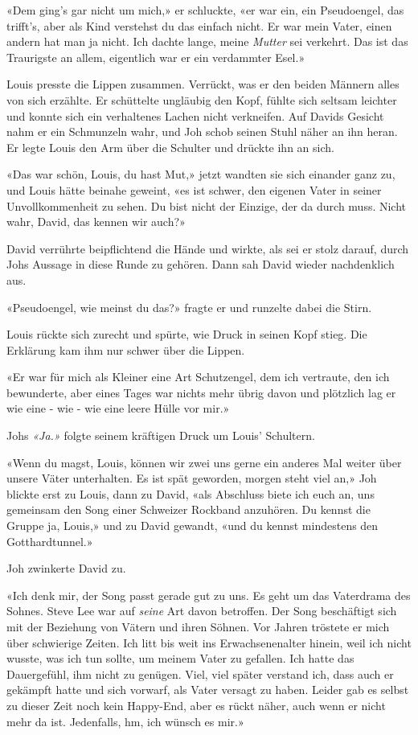 «Dem ging’s gar nicht um mich,» er schluckte, «er
war ein, ein Pseudoengel, das trifft’s, aber als Kind verstehst du das
einfach nicht. Er war mein Vater, einen andern hat man ja nicht. Ich
dachte lange, meine \emph{Mutter} sei verkehrt. Das ist das Traurigste
an allem, eigentlich war er ein verdammter Esel.»

Louis presste die Lippen zusammen. 
Verrückt, was er den beiden Männern alles von sich erzählte. Er schüttelte ungläubig den Kopf, fühlte sich seltsam leichter und konnte 
sich ein verhaltenes Lachen nicht verkneifen. Auf Davids Gesicht nahm er ein Schmunzeln wahr,   
und Joh schob seinen Stuhl näher an ihn heran. 
Er legte Louis den Arm über die Schulter und drückte ihn an sich.

«Das war schön, Louis, du hast Mut,» jetzt wandten sie sich einander
ganz zu, und Louis hätte beinahe geweint, «es ist schwer, den eigenen
Vater in seiner Unvollkommenheit zu sehen. Du bist nicht der Einzige,
der da durch muss. Nicht wahr, David, das kennen wir auch?»

David verrührte beipflichtend die Hände und wirkte, als sei er stolz
darauf, durch Johs Aussage in diese Runde zu gehören. Dann sah David
wieder nachdenklich aus.

«Pseudoengel, wie meinst du das?» fragte er und runzelte dabei die
Stirn.

Louis rückte sich zurecht und spürte, wie Druck in seinen Kopf stieg.
Die Erklärung kam ihm nur schwer über die Lippen.

«Er war für mich als Kleiner eine Art Schutzengel, dem ich vertraute,
den ich bewunderte, aber eines Tages war nichts mehr übrig davon und
plötzlich lag er wie eine - wie - wie eine leere Hülle vor mir.»

Johs \emph{«Ja.»} folgte seinem kräftigen Druck um Louis’ Schultern. 

«Wenn du magst, Louis, können wir zwei uns gerne ein anderes Mal weiter
über unsere Väter unterhalten. Es ist spät geworden, morgen steht viel
an,» Joh blickte erst zu Louis, dann zu David, «als Abschluss biete ich
euch an, uns gemeinsam den Song einer Schweizer Rockband anzuhören. Du
kennst die Gruppe ja, Louis,» und zu David gewandt, «und du kennst
mindestens den Gotthardtunnel.»

Joh zwinkerte David zu.

«Ich denk mir, der Song passt gerade gut zu uns. Es geht um das Vaterdrama des Sohnes. Steve Lee war auf \emph{seine}
Art davon betroffen. Der Song beschäftigt sich mit der Beziehung von
Vätern und ihren Söhnen. Vor Jahren tröstete er mich über
schwierige Zeiten. Ich litt bis weit ins Erwachsenenalter hinein, weil
ich nicht wusste, was ich tun sollte, um meinem Vater zu gefallen. Ich
hatte das Dauergefühl, ihm nicht zu genügen. Viel, viel später verstand
ich, dass auch er gekämpft hatte und sich vorwarf, als Vater versagt zu
haben. Leider gab es selbst zu dieser Zeit noch kein Happy-End, aber es
rückt näher, auch wenn er nicht mehr da ist. Jedenfalls, hm, ich wünsch
es mir.»

